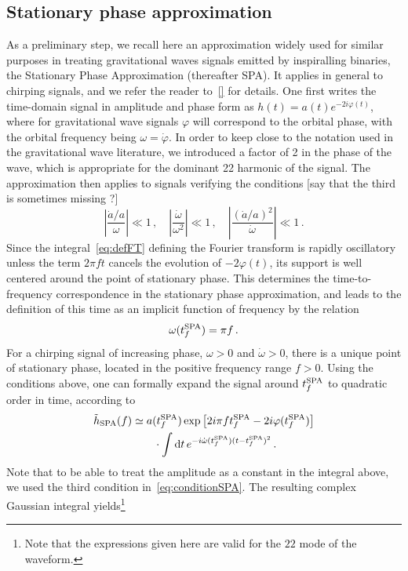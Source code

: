 \documentclass[aps,showpacs,twocolumn,
prd,superscriptaddress,nofootinbib]{revtex4-1}
\newcommand{\be}{\begin{equation}}
\newcommand{\ee}{\end{equation}}
\newcommand\ud{{\mathrm{d}}}
\newcommand{\nn}{\nonumber}
\newcommand{\SM}[1]{{\color{Red} #1}}
\begin{document}

\subsection{Stationary phase approximation}
\label{subsec:SPA}

As a preliminary step, we recall here an approximation widely used for similar purposes in treating gravitational waves signals emitted by inspiralling binaries, the Stationary Phase Approximation (thereafter SPA). It applies in general to chirping signals, and we refer the reader to~\ref{} for details. One first writes the time-domain signal in amplitude and phase form as $h(t) = a(t) e^{-2i\varphi(t)}$, where for gravitational wave signals $\varphi$ will correspond to the orbital phase, with the orbital frequency being $\omega = \dot{\varphi}$. In order to keep close to the notation used in the gravitational wave literature, we introduced a factor of 2 in the phase of the wave, which is appropriate for the dominant 22 harmonic of the signal. The approximation then applies to signals verifying the conditions \SM{[say that the third is sometimes missing ?]}
\be\label{eq:conditionSPA}
	\left| \frac{\dot{a}/a}{\omega} \right| \ll 1\,, \quad \left|\frac{\dot{\omega}}{\omega^{2}} \right| \ll 1\,, \quad \left| \frac{(\dot{a}/a)^{2}}{\dot{\omega}} \right| \ll 1 \,.
\ee
Since the integral~\eqref{eq:defFT} defining the Fourier transform is rapidly oscillatory unless the term $2\pi f t$ cancels the evolution of $-2\varphi(t)$, its support is well centered around the point of stationary phase. This determines the time-to-frequency correspondence in the stationary phase approximation, and leads to the definition of this time as an implicit function of frequency by the relation
\be\label{eq:deftfSPA}
	\omega(t_{f}^{\rm SPA}) = \pi  f \,.
\ee
For a chirping signal of increasing phase, $\omega>0$ and $\dot{\omega}>0$, there is a unique point of stationary phase, located in the positive frequency range $f>0$. Using the conditions above, one can formally expand the signal around $t_{f}^{\rm SPA}$ to quadratic order in time, according to
\begin{align}
	\tilde{h}_{\rm SPA} (f) &\simeq a(t_{f}^{\rm SPA}) \exp\left[2i\pi f t_{f}^{\rm SPA}-2i\varphi(t_{f}^{\rm SPA}) \right] \nn\\
	& \qquad \cdot \int \ud t \, e^{-i \dot{\omega} (t_{f}^{\rm SPA}) (t-t_{f}^{\rm SPA})^{2}} \,.
\end{align}
Note that to be able to treat the amplitude as a constant in the integral above, we used the third condition in~\eqref{eq:conditionSPA}. The resulting complex Gaussian integral yields\footnote{Note that the expressions given here are valid for the $22$ mode of the waveform.}
\end{document}

